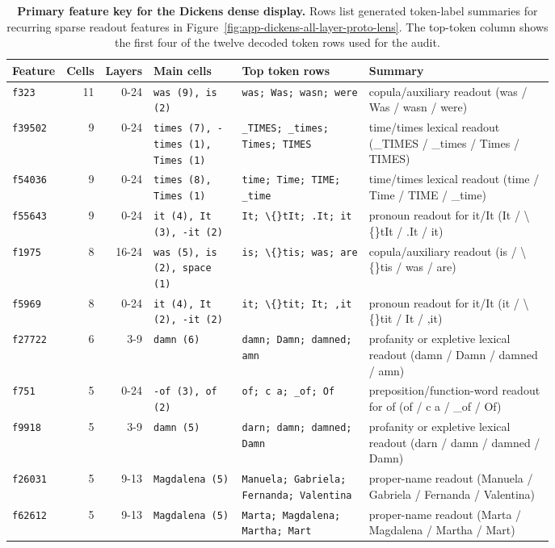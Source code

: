 
\begin{table}[p]
\caption{\textbf{Primary feature key for the Dickens dense display.} Rows list generated token-label summaries for recurring sparse readout features in Figure~\ref{fig:app-dickens-all-layer-proto-lens}. The top-token column shows the first four of the twelve decoded token rows used for the audit.}
\label{tab:app-dickens-feature-key-medium}
\centering
\scriptsize
\setlength{\tabcolsep}{2pt}
\begin{tabular}{@{}lrrp{0.17\linewidth}p{0.25\linewidth}p{0.36\linewidth}@{}}
\toprule
Feature & Cells & Layers & Main cells & Top token rows & Summary \\
\midrule
\texttt{f323} & 11 & 0-24 & \texttt{was (9), is (2)} & \texttt{was; Was; wasn; were} & copula/auxiliary readout (was / Was / wasn / were) \\
\texttt{f39502} & 9 & 0-24 & \texttt{times (7), -times (1), Times (1)} & \texttt{\_TIMES; \_times; Times; TIMES} & time/times lexical readout (\_TIMES / \_times / Times / TIMES) \\
\texttt{f54036} & 9 & 0-24 & \texttt{times (8), Times (1)} & \texttt{time; Time; TIME; \_time} & time/times lexical readout (time / Time / TIME / \_time) \\
\texttt{f55643} & 9 & 0-24 & \texttt{it (4), It (3), -it (2)} & \texttt{It; \textbackslash\{\}tIt; .It; it} & pronoun readout for it/It (It / \textbackslash\{\}tIt / .It / it) \\
\texttt{f1975} & 8 & 16-24 & \texttt{was (5), is (2), space (1)} & \texttt{is; \textbackslash\{\}tis; was; are} & copula/auxiliary readout (is / \textbackslash\{\}tis / was / are) \\
\texttt{f5969} & 8 & 0-24 & \texttt{it (4), It (2), -it (2)} & \texttt{it; \textbackslash\{\}tit; It; ,it} & pronoun readout for it/It (it / \textbackslash\{\}tit / It / ,it) \\
\texttt{f27722} & 6 & 3-9 & \texttt{damn (6)} & \texttt{damn; Damn; damned; amn} & profanity or expletive lexical readout (damn / Damn / damned / amn) \\
\texttt{f751} & 5 & 0-24 & \texttt{-of (3), of (2)} & \texttt{of; c a; \_of; Of} & preposition/function-word readout for of (of / c a / \_of / Of) \\
\texttt{f9918} & 5 & 3-9 & \texttt{damn (5)} & \texttt{darn; damn; damned; Damn} & profanity or expletive lexical readout (darn / damn / damned / Damn) \\
\texttt{f26031} & 5 & 9-13 & \texttt{Magdalena (5)} & \texttt{Manuela; Gabriela; Fernanda; Valentina} & proper-name readout (Manuela / Gabriela / Fernanda / Valentina) \\
\texttt{f62612} & 5 & 9-13 & \texttt{Magdalena (5)} & \texttt{Marta; Magdalena; Martha; Mart} & proper-name readout (Marta / Magdalena / Martha / Mart) \\
\bottomrule
\end{tabular}
\end{table}

